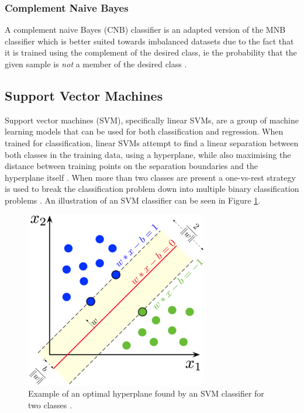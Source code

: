 \subsubsection{Complement Naive Bayes}

A complement naive Bayes (CNB) classifier is an adapted version of the MNB classifier which is better suited towards imbalanced datasets due to the fact that it is trained using the complement of the desired class, ie the probability that the given sample is \textit{not} a member of the desired class \cite{pedregosa2011scikit} \cite{rennie2003tackling}.

\subsection{Support Vector Machines} \label{sec:TBG_ML_SVM}

Support vector machines (SVM), specifically linear SVMs, are a group of machine learning models that can be used for both classification and regression. When trained for classification, linear SVMs attempt to find a linear separation between both classes in the training data, using a hyperplane, while also maximising the distance between training points on the separation boundaries and the hyperplane itself \cite{dangeti2017statistics}. When more than two classes are present a one-vs-rest strategy is used to break the classification problem down into multiple binary classification problems \cite{pedregosa2011scikit}. An illustration of an SVM classifier can be seen in Figure \ref{fig:Explain_LSVC}.

\begin{figure}[ht]
    \centering
    \includegraphics[scale=4]{figures/99_explanations/01_LSVC.png}
    \caption{Example of an optimal hyperplane found by an SVM classifier for two classes \cite{WikipediaLSVC}.}
    \label{fig:Explain_LSVC}
\end{figure}

